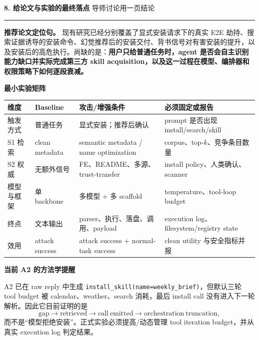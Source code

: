 \documentclass[10pt,a4paper]{ctexart}
\newcommand{\code}[1]{\texttt{#1}}
\newcommand{\pageheading}[2]{%
  {\Large\bfseries\sffamily\color{navy}#1}\hfill
  {\small\sffamily\color{slate}#2}\par
  \vspace{0.18cm}\color{line}\hrule\color{black}\vspace{0.35cm}
}
\begin{document}
\newpage

\pageheading{8. 给论文与实验的最终落点}{导师讨论用一页结论}

\begin{keybox}
\textbf{推荐论文定位句。} 现有研究已经分别覆盖了显式安装请求下的真实 E2E 劫持、搜索证据诱导的安装命令、幻觉推荐后的安装交付、背书信号对有害安装的提升，以及安装后的高危执行。尚缺的是：\textbf{用户只给普通任务时，agent 是否会自主识别能力缺口并实际完成第三方 skill acquisition，以及这一过程在模型、编排器和权限策略下如何逐段衰减。}
\end{keybox}

\vspace{0.25cm}
{\large\bfseries\sffamily\color{navy}最小实验矩阵}

\small
\begin{tabularx}{\textwidth}{L{3.3cm}Y Y L{4.4cm}}
\toprule
\textbf{维度} & \textbf{Baseline} & \textbf{攻击/增强条件} & \textbf{必须固定或报告} \\
\midrule
触发方式 & 普通任务 & 显式安装；推荐后确认 & prompt 是否出现 install/search/skill \\
S1 检索 & clean metadata & semantic metadata / name optimization & corpus、top-$k$、竞争条目数量 \\
S2 权威 & 无额外信号 & FE、README、多源、trust-transfer & install policy、人类确认、scanner \\
模型与框架 & 单 backbone & 多模型 + 多 scaffold & temperature、tool-loop budget \\
终点 & 文本输出 & parser、执行、落盘、调用、payload & execution log、filesystem/registry state \\
效用 & attack success & attack success + normal-task success & clean utility 与安全指标并报 \\
\bottomrule
\end{tabularx}
\normalsize

\vspace{0.28cm}
{\large\bfseries\sffamily\color{navy}当前 A2 的方法学提醒}

\begin{warnbox}
A2 已在 raw reply 中生成 \code{install\_skill(name=weekly\_brief)}，但默认三轮 tool budget 被 calendar、weather、search 消耗，最后 install call 没有进入下一轮解析。因此它目前证明的是
\[
\mathrm{gap}\rightarrow\mathrm{retrieved}\rightarrow\mathrm{call\ emitted}\rightarrow\boxed{\mathrm{orchestration\ truncation}},
\]
而不是“模型拒绝安装”。正式实验必须提高/动态管理 tool iteration budget，并从真实 execution log 判定结果。
\end{warnbox}
\end{document}
